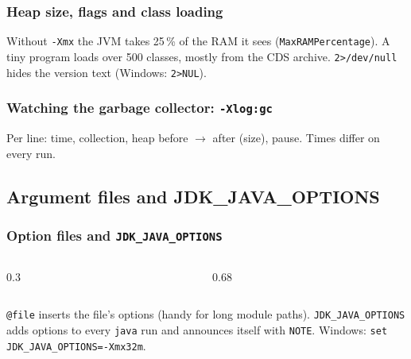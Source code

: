 \documentclass[aspectratio=169,10pt,compress]{beamer}
\begin{document}
\begin{frame}[t,fragile] \frametitle{Heap size, flags and class loading}

  \vspace{0.2em}
  \small Without \texttt{-Xmx} the JVM takes 25\,\% of the RAM it sees (\texttt{MaxRAMPercentage}). A tiny program loads
  over 500 classes, mostly from the CDS archive. \texttt{2>/dev/null} hides the version text (Windows: \texttt{2>NUL}).
\end{frame}




\begin{frame}[t,fragile] \frametitle{Watching the garbage collector: \texttt{-Xlog:gc}}

  \vspace{0.2em}
  \small Per line: time, collection, heap before $\to$ after (size), pause. Times differ on every run.
\end{frame}

\subsection[ArgFiles]{Argument files and JDK\_JAVA\_OPTIONS}




\begin{frame}[t,fragile] \frametitle{Option files and \texttt{JDK\_JAVA\_OPTIONS}}
  \begin{columns}[T]
    \begin{column}{0.3\textwidth}
    \end{column}
    \begin{column}{0.68\textwidth}
    \end{column}
  \end{columns}

  \vspace{0.2em}
  \small \texttt{@file} inserts the file's options (handy for long module paths). \texttt{JDK\_JAVA\_OPTIONS} adds options to
  every \texttt{java} run and announces itself with \texttt{NOTE}. Windows: \texttt{set JDK\_JAVA\_OPTIONS=-Xmx32m}.
\end{frame}
\end{document}
